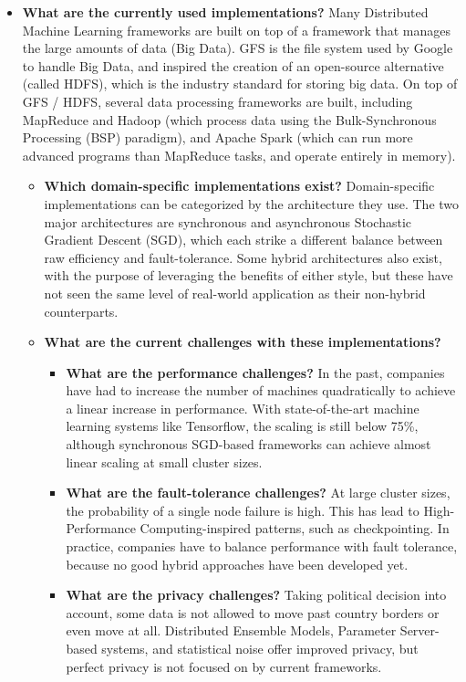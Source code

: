 \begin{itemize}
	\item \textbf{What are the currently used implementations?} Many Distributed Machine Learning frameworks are built on top of a framework that manages the large amounts of data (Big Data). GFS is the file system used by Google to handle Big Data, and inspired the creation of an open-source alternative (called HDFS), which is the industry standard for storing big data. On top of GFS / HDFS, several data processing frameworks are built, including MapReduce and Hadoop (which process data using the Bulk-Synchronous Processing (BSP) paradigm), and Apache Spark (which can run more advanced programs than MapReduce tasks, and operate entirely in memory).
	\begin{itemize}
		\item \textbf{Which domain-specific implementations exist?}
		Domain-specific implementations can be categorized by the architecture they use. The two major architectures are synchronous and asynchronous Stochastic Gradient Descent (SGD), which each strike a different balance between raw efficiency and fault-tolerance. Some hybrid architectures also exist, with the purpose of leveraging the benefits of either style, but these have not seen the same level of real-world application as their non-hybrid counterparts.
		\item \textbf{What are the current challenges with these implementations?}
		\begin{itemize}
			\item \textbf{What are the performance challenges?} In the past, companies have had to increase the number of machines quadratically to achieve a linear increase in performance. With state-of-the-art machine learning systems like Tensorflow, the scaling is still below 75\%, although synchronous SGD-based frameworks can achieve almost linear scaling at small cluster sizes.
			\item \textbf{What are the fault-tolerance challenges?} At large cluster sizes, the probability of a single node failure is high. This has lead to High-Performance Computing-inspired patterns, such as checkpointing. In practice, companies have to balance performance with fault tolerance, because no good hybrid approaches have been developed yet.
			\item \textbf{What are the privacy challenges?} Taking political decision into account, some data is not allowed to move past country borders or even move at all. Distributed Ensemble Models, Parameter Server-based systems, and statistical noise offer improved privacy, but perfect privacy is not focused on by current frameworks.
		\end{itemize}
	\end{itemize}
\end{itemize}
